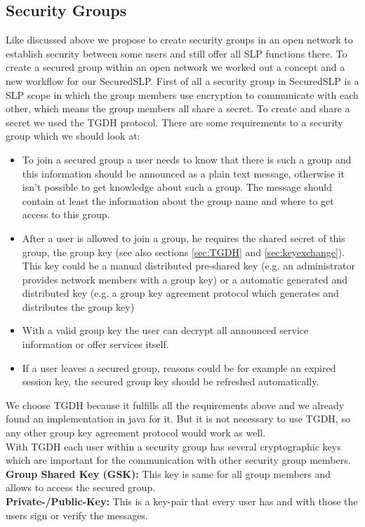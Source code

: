 \subsection{Security Groups}
Like discussed above we propose to create security groups in an open network to establish security between some users and still offer all SLP functions there. To create a secured group within an open network we worked out a concept and a new workflow for our SecuredSLP. First of all a security group in SecuredSLP is a SLP scope in which the group members use encryption to communicate with each other, which means the group members all share a secret. To create and share a secret we used the TGDH protocol. There are some requirements to a security group which we should look at:
\begin{itemize}
  \item To join a secured group a user needs to know that there is such a group and this information should be announced as a plain text message, otherwise it isn't possible to get knowledge about such a group. The message should contain at least the information about the group name and where to get access to this group.
  \item After a user is allowed to join a group, he requires the shared secret of this group, the group key (see also sections \ref{sec:TGDH} and \ref{sec:keyexchange}). This key could be a manual distributed pre-shared key (e.g. an administrator provides network members with a group key) or a automatic generated and distributed key (e.g. a group key agreement protocol which generates and distributes the group key)
  \item With a valid group key the user can decrypt all announced service information or offer services itself.
  \item If a user leaves a secured group, reasons could be for example an expired session key, the secured group key should be refreshed automatically.
\end{itemize}
We choose TGDH because it fulfills all the requirements above and we already found an implementation in java for it. But it is not necessary to use TGDH, so any other group key agreement protocol would work as well.\\
With TGDH each user within a security group has several cryptographic keys which are important for the communication with other security group members.\\
\textbf{Group Shared Key (GSK):} This key is same for all group members and allows to access the secured group.\\
\textbf{Private-/Public-Key:} This is a key-pair that every user has and with those the users sign or verify the messages.

